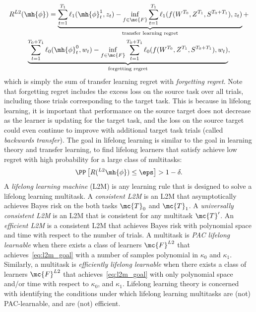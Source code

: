 \documentclass{article}
\begin{document}
\begin{multline*}
    R^{L2}(\mh{\phi}) =     \underbrace{\sum_{t=1}^{T_1} \ell_1(\mh{\phi}^1_t, z_t)       - \inf_{f \in \mc{F}} \sum_{t=1}^{T_1} \ell_1(f(W^{T_0}, Z^{T_1}, S^{T_0+T_1}), z_t)}_{\text{transfer learning regret}} + \\
     \underbrace{\sum_{t=1}^{T_0+T_1} \ell_0(\mh{\phi}^0_t, w_t)   - \inf_{f \in \mc{F}} \sum_{t=1}^{T_0+T_1} \ell_0(f(W^{T_0}, Z^{T_1}, S^{T_0+T_1}), w_t)  }_{\text{forgetting regret}},
\end{multline*}
which is simply the sum of transfer learning regret with \emph{forgetting regret}.  Note that forgetting regret includes the excess loss on the source task over all trials, including those trials corresponding to the target task.  This is because in lifelong learning, it is important that performance on the source target does not decrease as the learner is updating for the target task, and the loss on the source target could even continue to improve with additional target task trials (called \emph{backwards transfer}).
The goal in lifelong learning is similar to the goal in learning theory and transfer learning, to find lifelong learners that satisfy achieve low regret with high probability for a large class of multitasks:
\begin{align} \label{eq:l2m_goal}
    \PP\left[R(^{L2}\mh{\phi})  \leq \eps \right] > 1 - \delta.
\end{align}
A \emph{lifelong learning machine} (L2M) is any learning rule that is designed to solve a lifelong learning multitask. A \emph{consistent L2M} is an L2M that asymptotically achieves Bayes risk on the both tasks $\mc{T}_0$ and $\mc{T}_1$.  
A \emph{universally consistent L2M} is an L2M that is consistent for any multitask $\mc{T}'$.  
An \emph{efficient L2M}  is a consistent L2M that achieves Bayes risk with polynomial space and time with respect to the number of trials. 
A multitask is \emph{PAC lifelong learnable} when there exists a class of learners $\mc{F}^{L2}$ that achieves~\eqref{eq:l2m_goal} with a number of samples polynomial in $\kappa_0$ and $\kappa_1$.  Similarly, a multitask is \emph{efficiently lifelong learnable} when there exists a class of learners $\mc{F}^{L2}$ that achieves~\eqref{eq:l2m_goal} with only polynomial space and/or time with respect to $\kappa_0$, and $ \kappa_1$.
{Lifelong learning theory is concerned with identifying the conditions under which lifelong learning multitasks are (not) PAC-learnable, and are (not) efficient.}
\end{document}
